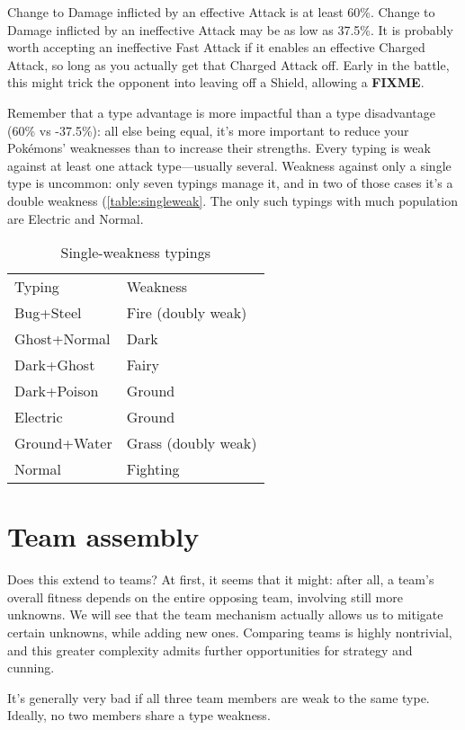 Change to Damage inflicted by an effective Attack is at least 60\%.
Change to Damage inflicted by an ineffective Attack may be as
 low as 37.5\%.
It is probably worth accepting an ineffective Fast Attack if it
 enables an effective Charged Attack, so long as you actually
 get that Charged Attack off.
Early in the battle, this might trick the opponent into leaving
 off a Shield, allowing a \textbf{FIXME}.

Remember that a type advantage is more impactful than a type
  disadvantage (60\% vs -37.5\%):
  all else being equal, it's more important to reduce your Pokémons'
  weaknesses than to increase their strengths.
Every typing is weak against at least one attack type---usually several.
Weakness against only a single type is uncommon: only seven typings manage it, and in two
 of those cases it's a double weakness (\autoref{table:singleweak}.
The only such typings with much population are Electric and Normal. 
\begin{table}[ht]
\begin{center}
\begin{tabular}{ll}
Typing & Weakness\\
\Midrule
Bug+Steel & Fire (doubly weak) \\
Ghost+Normal & Dark \\
Dark+Ghost & Fairy \\
Dark+Poison & Ground \\
Electric & Ground \\
Ground+Water & Grass (doubly weak) \\
Normal & Fighting \\
\end{tabular}
\end{center}
\caption{Single-weakness typings}
\label{table:singleweak}
\end{table}
\section{Team assembly}
Does this extend to teams?
At first, it seems that it might: after all, a team's overall fitness
 depends on the entire opposing team, involving still more unknowns.
We will see that the team mechanism actually allows us to mitigate certain
 unknowns, while adding new ones.
Comparing teams is highly nontrivial, and this greater complexity admits
 further opportunities for strategy and cunning.

It's generally very bad if all three team members are weak to the same type.
Ideally, no two members share a type weakness.

